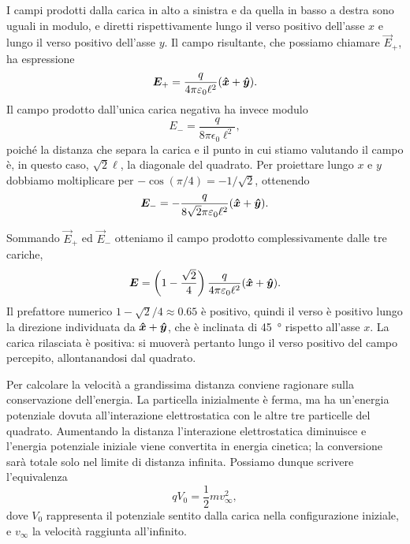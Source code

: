 \documentclass[10pt]{gulartcl}
\begin{document}
\begin{solution}
I campi prodotti dalla carica in alto a sinistra e da quella in basso a
destra sono uguali in modulo, e diretti rispettivamente lungo il verso
positivo dell’asse $x$ e lungo il verso positivo dell’asse $y$. Il campo
risultante, che possiamo chiamare $\vec{E}_{+}$, ha espressione
\begin{equation}
    \bm{E}_{+} = \frac{q}{4\pi\varepsilon_0 \ell^{2}} (\bm{\hat{x}} + \bm{\hat{y}}).
\end{equation}
Il campo prodotto dall’unica carica negativa ha invece modulo
\begin{equation}
    E_{-} = \frac{q}{8\pi\epsilon_0 \ell^{2}},
\end{equation}
poiché la distanza che separa la carica e il punto in cui stiamo valutando
il campo è, in questo caso, $\sqrt{2} \ell$, la diagonale del quadrato.
Per proiettare lungo $x$ e $y$ dobbiamo moltiplicare per $-\cos(\pi / 4) =
-1 / \sqrt{2}$, ottenendo
\begin{equation}
    \bm{E}_{-} = -\frac{q}{8\sqrt{2}\pi\varepsilon_0 \ell^{2}} (\bm{\hat{x}} +
    \bm{\hat{y}}).
\end{equation}

Sommando $\vec{E}_{+}$ ed $\vec{E}_{-}$ otteniamo il campo prodotto
complessivamente dalle tre cariche,
\begin{equation}
    \bm{E} = \left(1 - \frac{\sqrt{2}}{4}\right) \frac{q}{4\pi\varepsilon_0
    \ell^2} (\bm{\hat{x}} + \bm{\hat{y}}).
\end{equation}
Il prefattore numerico $1 - \sqrt{2} / 4 \approx \num{0.65}$ è positivo,
quindi il verso è positivo lungo la direzione individuata da $\bm{\hat{x}} +
\bm{\hat{y}}$, che è inclinata di \qty{45}{\degree} rispetto all’asse $x$. La
carica rilasciata è positiva: si muoverà pertanto lungo il verso positivo del
campo percepito, allontanandosi dal quadrato.

Per calcolare la velocità a grandissima distanza conviene ragionare sulla
conservazione dell’energia. La particella inizialmente è ferma, ma ha
un’energia potenziale dovuta all’interazione elettrostatica con le altre
tre particelle del quadrato. Aumentando la distanza l’interazione
elettrostatica diminuisce e l’energia potenziale iniziale viene convertita
in energia cinetica; la conversione sarà totale solo nel limite di distanza
infinita. Possiamo dunque scrivere l’equivalenza
\begin{equation}
    q V_{0} = \frac{1}{2} m v_{\infty}^{2},
    \label{eq:energy-cons}
\end{equation}
dove $V_0$ rappresenta il potenziale sentito dalla carica nella
configurazione iniziale, e $v_{\infty}$ la velocità raggiunta
all’infinito.


\end{solution}
\end{document}
